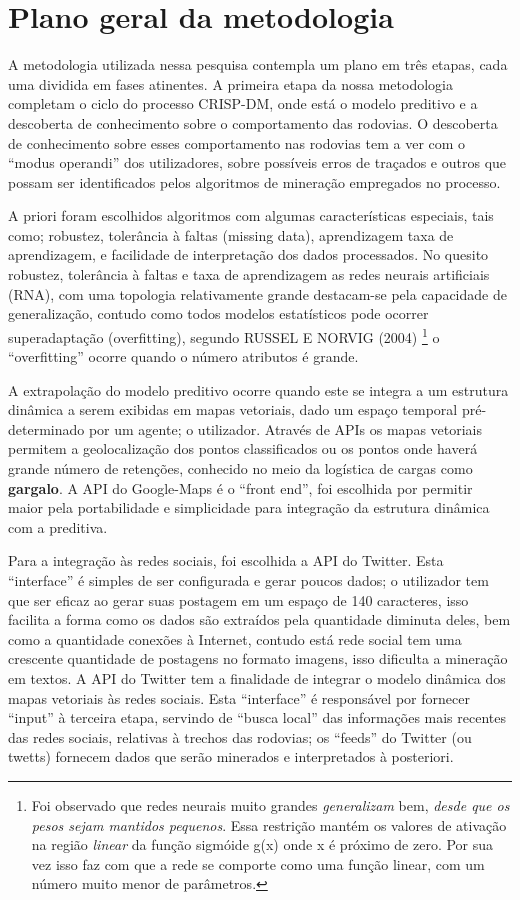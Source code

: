 \section{Plano geral da metodologia}

A metodologia utilizada nessa pesquisa contempla um plano em três etapas, cada uma dividida em fases atinentes.
A primeira etapa da nossa metodologia completam o ciclo do processo CRISP-DM, onde está o modelo preditivo e 
a descoberta de conhecimento sobre o comportamento das rodovias. O descoberta de conhecimento sobre esses comportamento 
nas rodovias tem a ver com o ``modus operandi'' dos utilizadores, sobre possíveis erros de traçados e outros que possam
ser identificados pelos algoritmos de mineração empregados no processo.

A priori foram escolhidos algoritmos com algumas características especiais, tais como; robustez, tolerância à faltas (missing data),
aprendizagem taxa de aprendizagem, e facilidade de interpretação dos dados processados. 
No quesito robustez, tolerância à faltas e taxa de aprendizagem as redes neurais artificiais (RNA), com uma 
topologia relativamente grande destacam-se pela capacidade de generalização, contudo como todos modelos estatísticos pode ocorrer 
superadaptação (overfitting), segundo RUSSEL E NORVIG (2004)  \footnote{Foi observado que redes neurais muito grandes \textit{generalizam} bem, 
\textit{desde que os pesos sejam mantidos pequenos}. Essa restrição mantém os valores de ativação na região 
\textit{linear} da função sigmóide g(x) onde x é próximo de zero. Por sua vez isso faz com que a rede se comporte 
como uma função linear, com um número muito menor de parâmetros.} o ``overfitting''
 ocorre quando o número atributos é grande.

A extrapolação do modelo preditivo ocorre quando este se integra a um estrutura dinâmica a serem exibidas em mapas vetoriais, 
dado um espaço temporal pré-determinado por um agente; o utilizador. 
Através de APIs os mapas vetoriais permitem a geolocalização dos pontos classificados ou os pontos onde haverá grande número de 
retenções, conhecido no meio da logística de cargas como \textbf{gargalo}.
A API do Google-Maps é o ``front end'', foi escolhida por permitir maior pela portabilidade e simplicidade para integração da estrutura
dinâmica com a preditiva.

Para a integração às redes sociais, foi escolhida a API do Twitter. Esta ``interface'' é simples de ser configurada e gerar poucos dados; 
o utilizador tem que ser eficaz ao gerar suas postagem em um espaço de 140 caracteres, isso facilita a forma como os dados são
extraídos pela quantidade diminuta deles, bem como a quantidade conexões à Internet, contudo está rede social tem uma crescente quantidade
de postagens no formato imagens, isso dificulta a mineração em textos.
A API do Twitter tem a finalidade de integrar o modelo dinâmica dos mapas vetoriais às redes sociais. 
Esta ``interface'' é responsável por fornecer ``input'' à terceira etapa, servindo de ``busca local'' das informações mais recentes das 
redes sociais, relativas à trechos das rodovias; os ``feeds'' do Twitter (ou twetts) fornecem dados que serão minerados e interpretados à posteriori.


